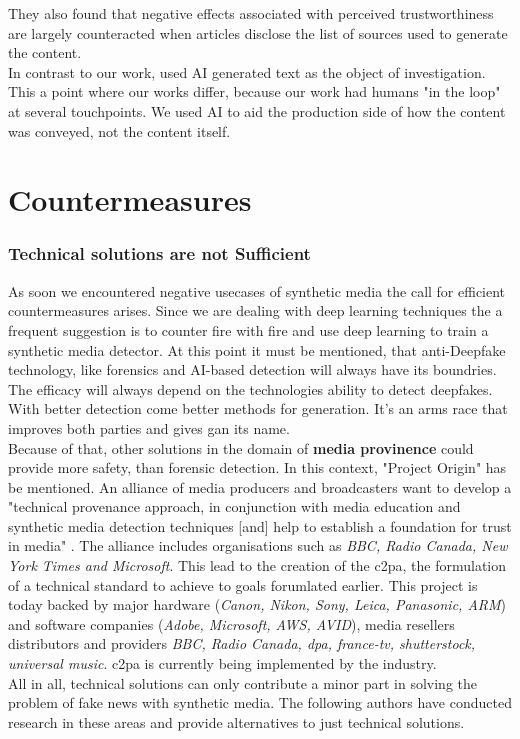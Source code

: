 \documentclass[
  a4paper,  %
  twoside,  %
  bibliography=totoc,
  headsepline,
  cleardoublepage=empty,
  parskip=half,
  draft=false
]{scrbook}
\begin{document}
They also found that negative effects associated with perceived trustworthiness are largely counteracted when articles disclose the list of sources used to generate the content. \\
In contrast to our work, \citeauthor{toffTheyCouldJust2023} used AI generated text as the object of investigation. This a point where our works differ, because our work had humans "in the loop" at several touchpoints. We used AI to aid the production side of how the content was conveyed, not the content itself. 


\section{Countermeasures}
\label{sec:rel-work-counteringdf}
\subsubsection*{Technical solutions are not Sufficient}
As soon we encountered negative usecases of synthetic media the call for efficient countermeasures arises. Since we are dealing with deep learning techniques the a frequent suggestion is to counter fire with fire and use deep learning to train a synthetic media detector. At this point it must be mentioned, that anti-Deepfake technology, like forensics and AI-based detection will always have its boundries. The efficacy will always depend on the technologies ability to detect deepfakes. With better detection come better methods for generation. It's an arms race that improves both parties and gives \gls{gan} its name. \\
Because of that, other solutions in the domain of \textbf{media provinence} could provide more safety, than forensic detection. In this context, "Project Origin" has be mentioned. An alliance of media producers and broadcasters want to develop a "technical provenance approach, in conjunction with media education and synthetic media detection techniques [and] help to establish a foundation for trust in media" \cite{ProjectOrigin}. The alliance includes organisations such as \textit{BBC, Radio Canada, New York Times and Microsoft}. This lead to the creation of the \gls{c2pa}, the formulation of a technical standard to achieve to goals forumlated earlier. This project is today backed by major hardware (\textit{Canon, Nikon, Sony, Leica, Panasonic, ARM}) and software companies (\textit{Adobe, Microsoft, AWS, AVID}), media resellers distributors and providers \textit{BBC, Radio Canada, dpa, france-tv, shutterstock, universal music}. \gls{c2pa} is currently being implemented by the industry. \\
All in all, technical solutions can only contribute a minor part in solving the problem of fake news with synthetic media. The following authors have conducted research in these areas and provide alternatives to just technical solutions. 
\end{document}
